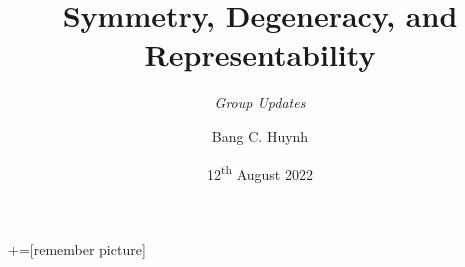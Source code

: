 



\newlength{\size}
\setlength{\size}{0.6cm}
\newlength{\marksize}
\newlength{\plotheight}
\newlength{\plotwidth}

\title[Symmetry, Degeneracy, and Representability]{Symmetry, Degeneracy, and Representability}

\subtitle{
  {\small \normalfont \textit{Group Updates}}
}

\author[B. C. Huynh]{Bang C. Huynh}


\date[12th August 2022]{12\textsuperscript{\tiny th} August 2022}





%

  +=[remember picture]

  \everymath{\displaystyle}

  \begin{frame}
    \titlepage
  \end{frame}

  
  
  
  


